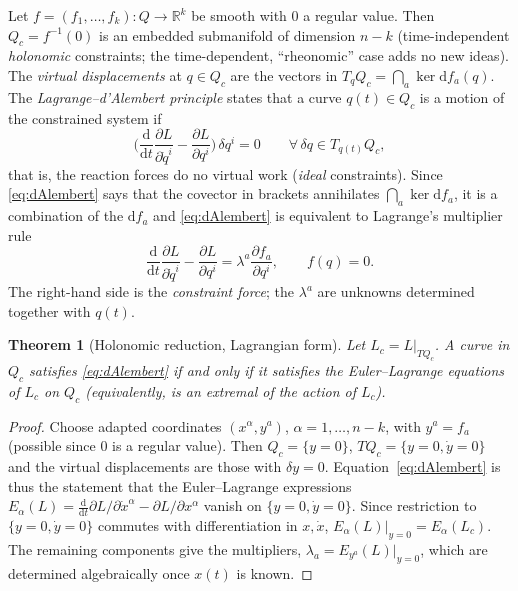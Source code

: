 \documentclass[11pt,a4paper]{article}
\numberwithin{equation}{section}
\theoremstyle{plain}
\newtheorem{theorem}{Theorem}[section]
\theoremstyle{definition}
\theoremstyle{remark}
\newcommand{\R}{\mathbb{R}}
\newcommand{\dd}{\mathrm{d}}
\begin{document}
Let $f=(f_1,\dots,f_k):Q\to\R^k$ be smooth with $0$ a regular value. Then $Q_c=f^{-1}(0)$ is an embedded submanifold of dimension $n-k$ (time-independent \emph{holonomic} constraints; the time-dependent, ``rheonomic'' case adds no new ideas). The \emph{virtual displacements} at $q\in Q_c$ are the vectors in $T_qQ_c=\bigcap_a\ker\dd f_a(q)$. The \emph{Lagrange--d'Alembert principle} states that a curve $q(t)\in Q_c$ is a motion of the constrained system if
\begin{equation}\label{eq:dAlembert}
\Big(\frac{\dd}{\dd t}\frac{\partial L}{\partial\dot q^i}-\frac{\partial L}{\partial q^i}\Big)\,\delta q^i=0\qquad\forall\,\delta q\in T_{q(t)}Q_c ,
\end{equation}
that is, the reaction forces do no virtual work (\emph{ideal} constraints). Since \eqref{eq:dAlembert} says that the covector in brackets annihilates $\bigcap_a\ker\dd f_a$, it is a combination of the $\dd f_a$ and \eqref{eq:dAlembert} is equivalent to Lagrange's multiplier rule
\begin{equation}\label{eq:lagmult}
\frac{\dd}{\dd t}\frac{\partial L}{\partial\dot q^i}-\frac{\partial L}{\partial q^i}=\lambda^a\frac{\partial f_a}{\partial q^i},\qquad f(q)=0 .
\end{equation}
The right-hand side is the \emph{constraint force}; the $\lambda^a$ are unknowns determined together with $q(t)$.

\begin{theorem}[Holonomic reduction, Lagrangian form]\label{thm:holored}
Let $L_c=L|_{TQ_c}$. A curve in $Q_c$ satisfies \eqref{eq:dAlembert} if and only if it satisfies the Euler--Lagrange equations of $L_c$ on $Q_c$ (equivalently, is an extremal of the action of $L_c$).
\end{theorem}
\begin{proof}
Choose adapted coordinates $(x^\alpha,y^a)$, $\alpha=1,\dots,n-k$, with $y^a=f_a$ (possible since $0$ is a regular value). Then $Q_c=\{y=0\}$, $TQ_c=\{y=0,\dot y=0\}$ and the virtual displacements are those with $\delta y=0$. Equation~\eqref{eq:dAlembert} is thus the statement that the Euler--Lagrange expressions $E_\alpha(L)=\frac{\dd}{\dd t}\partial L/\partial\dot x^\alpha-\partial L/\partial x^\alpha$ vanish on $\{y=0,\dot y=0\}$. Since restriction to $\{y=0,\dot y=0\}$ commutes with differentiation in $x,\dot x$, $E_\alpha(L)|_{y=0}=E_\alpha(L_c)$. The remaining components give the multipliers, $\lambda_a=E_{y^a}(L)|_{y=0}$, which are determined algebraically once $x(t)$ is known.
\end{proof}
\end{document}
